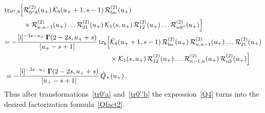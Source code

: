 \documentclass[a4paper,11pt]{article}
\renewcommand{\imath}{\mathrm{i}}
\newcommand{\tr}{\mathop{\rm tr}\nolimits}
\numberwithin{equation}{section}
\begin{document}
\begin{align}
	& \nonumber
	\begin{aligned}
		\tr_{0'',b}\Bigl[ &
		\mathcal{R}^{(2)}_{0''b}(u_+)\,\tilde{\mathcal{K}}_b(u_++1,s-1)\,\mathcal{R}^{(2)}_{bn}(u_+) \\
		&
		\times
		\mathcal{R}^{(2)}_{n,n-1}(u_+)\ldots\mathcal{R}^{(2)}_{21}(u_+)\,\mathcal{K}_1(s,u_+)\,\mathcal{R}^{(2)}_{12}(u_+)\ldots\mathcal{R}^{(2)}_{n0''}(u_+) \Bigr]
	\end{aligned}
	\\
	& \nonumber
	\begin{aligned}
		= -\frac{[\imath]^{-3s-u_+}\,\mathbf{\Gamma}(2-2s, u_++s)}{[u_+-s+1]}
		\tr_{b}\Bigl[ &
		\tilde{\mathcal{K}}_b(u_++1,s-1)\,\mathcal{R}^{(2)}_{bn}(u_+) \,
		\mathcal{R}^{(2)}_{n,n-1}(u_+)\ldots\mathcal{R}^{(2)}_{21}(u_+) \\
		&
		\times
		\mathcal{K}_1(s,u_+)\,\mathcal{R}^{(2)}_{12}(u_+)\ldots\mathcal{R}^{(2)}_{n-1,n}(u_+)\,\mathcal{R}^{(2)}_{nb}(u_+)\Bigr]
	\end{aligned}
	\\
	& \label{tr0''b}
	= -\frac{[\imath]^{-3s-u_+}\,\mathbf{\Gamma}(2-2s, u_++s)}{[u_+-s+1]} \, \hat{Q}_+(u_+) \,.
\end{align}
Thus after transformations~\eqref{tr0'a} and~\eqref{tr0''b} the expression~\eqref{Q4} turns into the desired factorization formula~\eqref{Qfact2}.
\end{document}
